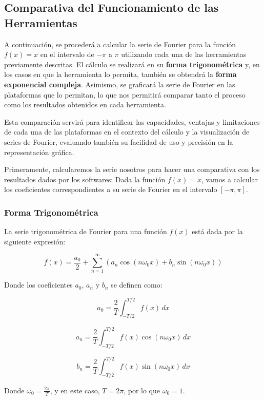\subsection{Comparativa del Funcionamiento de las Herramientas}

A continuación, se procederá a calcular la serie de Fourier para la función \( f(x) = x \) en el intervalo de \(-\pi\) a \(\pi\) utilizando cada una de las herramientas previamente descritas. El cálculo se realizará en su \textbf{forma trigonométrica} y, en los casos en que la herramienta lo permita, también se obtendrá la \textbf{forma exponencial compleja}. Asimismo, se graficará la serie de Fourier en las plataformas que lo permitan, lo que nos permitirá comparar tanto el proceso como los resultados obtenidos en cada herramienta. \newline

Esta comparación servirá para identificar las capacidades, ventajas y limitaciones de cada una de las plataformas en el contexto del cálculo y la visualización de series de Fourier, evaluando también su facilidad de uso y precisión en la representación gráfica.\newline

Primeramente, calcularemos la serie nosotros para hacer una comparativa con los resultados dados por los softwares:\newline
Dada la función \( f(x) = x \), vamos a calcular los coeficientes correspondientes a su serie de Fourier en el intervalo \([- \pi, \pi]\).

\subsubsection{Forma Trigonométrica}

La serie trigonométrica de Fourier para una función \( f(x) \) está dada por la siguiente expresión:

\[
f(x) = \frac{a_0}{2} + \sum_{n=1}^{\infty} \left( a_n \cos(n \omega_0 x) + b_n \sin(n \omega_0 x) \right)
\]

Donde los coeficientes \( a_0 \), \( a_n \) y \( b_n \) se definen como:

\[
a_0 = \frac{2}{T} \int_{-T/2}^{T/2} f(x) \, dx
\]

\[
a_n = \frac{2}{T} \int_{-T/2}^{T/2} f(x) \cos(n \omega_0 x) \, dx
\]

\[
b_n = \frac{2}{T} \int_{-T/2}^{T/2} f(x) \sin(n \omega_0 x) \, dx
\]

Donde \( \omega_0 = \frac{2\pi}{T} \), y en este caso, \( T = 2\pi \), por lo que \( \omega_0 = 1 \).

